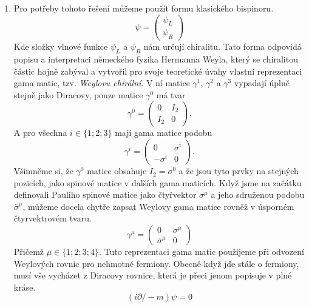 \documentclass{../../../../style/mkimain}
\begin{document}
\noindent{}
\klein

\begin{enumerate}
    \item Pro potřeby tohoto řešení můžeme použít formu klasického bispinoru.
    \begin{equation} \label{eq:1}
    \psi=\begin{pmatrix}
        \psi_L\\
        \psi_R
    \end{pmatrix}
    \end{equation}
    Kde složky vlnové funkce $\psi_L$ a $\psi_R$ nám určují chiralitu. Tato forma odpovídá popisu a interpretaci německého fyzika Hermanna Weyla, který se chiralitou částic hojně zabýval a vytvořil pro svoje teoretické úvahy vlastní reprezentaci gama matic, tzv. \emph{Weylovu chirální}. V ní matice $\gamma^1$, $\gamma^2$ a $\gamma^3$ vypadají úplně stejně jako Diracovy, pouze matice $\gamma^0$ má tvar
     $$\gamma^0=\begin{pmatrix}
        0 & I_2\\
        I_2 & 0
    \end{pmatrix} \text{.}$$
A pro všechna $i\in\{1;2;3\}$ mají gama matice podobu
     $$\gamma^i=\begin{pmatrix}
        0 & \sigma^i\\
        -\sigma^i & 0
    \end{pmatrix} \text{.}$$
Všimněme si, že $\gamma^0$ matice obsahuje $I_2=\sigma^0$ a že jsou tyto prvky na stejných pozicích, jako spinové matice v dalších gama maticích. Když jsme na začátku definovali Pauliho spinové matice jako čtyřvektor $\sigma^\mu$ a jeho sdruženou podobu $\bar{\sigma}^\mu$, můžeme docela chytře zapsat Weylovy gama matice rovněž v úsporném čtyrvektrovém tvaru.
\begin{equation} \label{eq:2}
 \gamma^\mu=\begin{pmatrix}
        0 & \sigma^\mu\\
        \bar{\sigma}^\mu & 0
    \end{pmatrix}
\end{equation}
Přičemž $\mu\in\{1;2;3;4\}$.
Tuto reprezentaci gama matic použijeme při odvození Weylových rovnic pro nehmotné fermiony. Obecně když jde stále o fermiony, musí vše vycházet z Diracovy rovnice, která je přeci jenom popisuje v plné kráse.
 $$\left(i\partial\!\!\!/-m\right)\psi=0$$

\end{enumerate}
\end{document}
